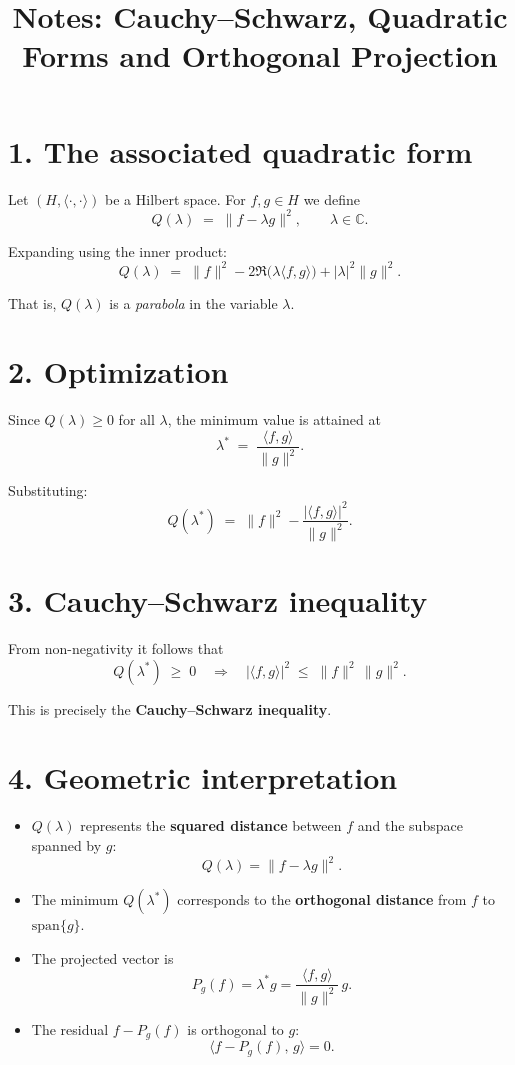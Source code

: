 \documentclass[12pt]{article}
\title{Notes: Cauchy--Schwarz, Quadratic Forms and Orthogonal Projection}
\author{}
\date{}
\begin{document}
\maketitle

\section*{1. The associated quadratic form}
Let $(H,\langle \cdot,\cdot\rangle)$ be a Hilbert space. 
For $f,g \in H$ we define
\[
Q(\lambda) \;=\; \|f - \lambda g\|^2, \qquad \lambda \in \mathbb{C}.
\]

\noindent
Expanding using the inner product:
\[
Q(\lambda) \;=\; \|f\|^2 - 2\Re\!\big(\lambda \langle f,g\rangle\big) + |\lambda|^2 \|g\|^2.
\]

That is, $Q(\lambda)$ is a \emph{parabola} in the variable $\lambda$.

\section*{2. Optimization}
Since $Q(\lambda) \geq 0$ for all $\lambda$, the minimum value is attained at
\[
\lambda^* \;=\; \frac{\langle f,g\rangle}{\|g\|^2}.
\]

\noindent
Substituting:
\[
Q(\lambda^*) \;=\; \|f\|^2 - \frac{|\langle f,g\rangle|^2}{\|g\|^2}.
\]

\section*{3. Cauchy--Schwarz inequality}
From non-negativity it follows that
\[
Q(\lambda^*) \;\geq\; 0 
\quad \Longrightarrow \quad
|\langle f,g\rangle|^2 \;\leq\; \|f\|^2 \, \|g\|^2.
\]

\noindent
This is precisely the \textbf{Cauchy--Schwarz inequality}.

\section*{4. Geometric interpretation}
\begin{itemize}
  \item $Q(\lambda)$ represents the \textbf{squared distance} between $f$ and the subspace spanned by $g$:
  \[
  Q(\lambda) = \|f - \lambda g\|^2.
  \]
  \item The minimum $Q(\lambda^*)$ corresponds to the \textbf{orthogonal distance} from $f$ to $\text{span}\{g\}$.
  \item The projected vector is
  \[
  P_g(f) = \lambda^* g = \frac{\langle f,g\rangle}{\|g\|^2}\, g.
  \]
  \item The residual $f - P_g(f)$ is orthogonal to $g$:
  \[
  \langle f - P_g(f), \, g \rangle = 0.
  \]
\end{itemize}
\end{document}

